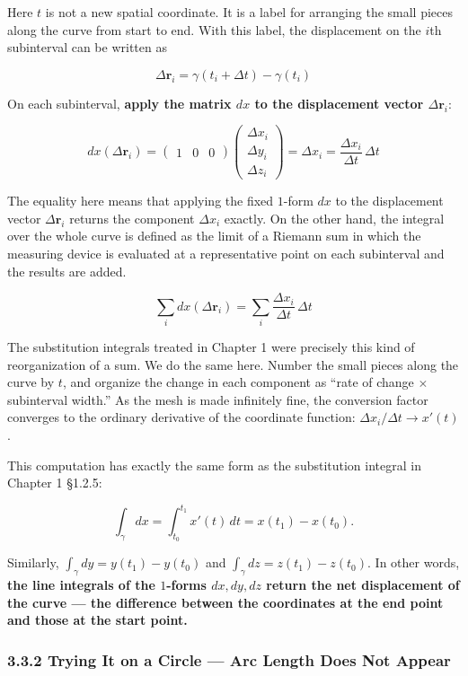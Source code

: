 \documentclass[a4paper,12pt,openany]{book}
\begin{document}
Here \(t\) is not a new spatial coordinate. It is a label for arranging
the small pieces along the curve from start to end. With this label, the
displacement on the \(i\)th subinterval can be written as

\[
\Delta\mathbf{r}_i = \gamma(t_i+\Delta t)-\gamma(t_i)
\]

On each subinterval,
\textbf{apply the matrix $dx$ to the displacement vector $\Delta\mathbf{r}_i$}:

\[dx(\Delta\mathbf{r}_i) = \begin{pmatrix}1&0&0\end{pmatrix} \begin{pmatrix}\Delta x_i \\ \Delta y_i \\ \Delta z_i\end{pmatrix} = \Delta x_i = \frac{\Delta x_i}{\Delta t}\,\Delta t\]

The equality here means that applying the fixed \(1\)-form \(dx\) to the
displacement vector \(\Delta\mathbf{r}_i\) returns the component
\(\Delta x_i\) exactly. On the other hand, the integral over the whole
curve is defined as the limit of a Riemann sum in which the measuring
device is evaluated at a representative point on each subinterval and
the results are added.

\[\sum_i dx(\Delta\mathbf{r}_i) = \sum_i \frac{\Delta x_i}{\Delta t}\,\Delta t\]

The substitution integrals treated in Chapter 1 were precisely this kind
of reorganization of a sum. We do the same here. Number the small pieces
along the curve by \(t\), and organize the change in each component as
``rate of change \(\times\) subinterval width.'' As the mesh is made
infinitely fine, the conversion factor converges to the ordinary
derivative of the coordinate function:
\(\Delta x_i/\Delta t \to x'(t)\).

This computation has exactly the same form as the substitution integral
in Chapter 1 §1.2.5:

\[\int_\gamma dx = \int_{t_0}^{t_1} x'(t)\,dt = x(t_1)-x(t_0).\]

Similarly, \(\int_\gamma dy = y(t_1) - y(t_0)\) and
\(\int_\gamma dz = z(t_1) - z(t_0)\). In other words,
\textbf{the line integrals of the $1$-forms $dx, dy, dz$ return the net displacement of the curve — the difference between the coordinates at the end point and those at the start point.}

\hypertarget{trying-it-on-a-circle-arc-length-does-not-appear}{%
\subsubsection{3.3.2 Trying It on a Circle — Arc Length Does Not
Appear}\label{trying-it-on-a-circle-arc-length-does-not-appear}}
\end{document}
